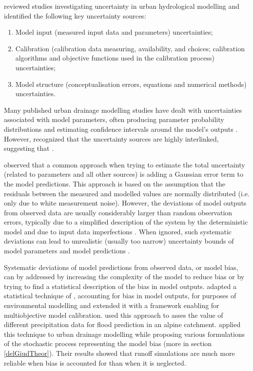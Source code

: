 \documentclass{ctuthesis}\usepackage[]{graphicx}\usepackage[]{color}
\begin{document}
\cite{deleticAssessingUncertaintiesUrban2012} reviewed studies investigating uncertainty in urban hydrological modelling and identified the following key uncertainty sources:
\begin{enumerate}
        \item Model input (measured input data and parameters) uncertainties;
        \item Calibration (calibration data measuring, availability, and choices; calibration algorithms and objective functions used in the calibration process) uncertainties;
        \item Model structure (conceptualisation errors, equations and numerical methods) uncertainties. 
\end{enumerate}

Many published urban drainage modelling studies have dealt with uncertainties associated with model parameters, often producing parameter probability distributions and estimating confidence intervals around the model’s outputs \citep[e.g.][]{thorndahlEventBasedUncertainty2008, dotto2012comparison}. However, \cite{deleticAssessingUncertaintiesUrban2012} recognized that the uncertainty sources are highly interlinked, suggesting that .

\cite{dotto2012comparison} observed that a common approach when trying to estimate the total uncertainty (related to parameters and all other sources) is adding a Gaussian error term to the model predictions. This approach is based on the assumption that the residuals between the measured and modelled values are normally distributed (i.e. only due to white measurement noise). However, the deviations of model outputs from observed data are usually considerably larger than random observation errors, typically due to a simplified description of the system by the deterministic model and due to input data imperfections \citep{reichert2012linking}. When ignored, such systematic deviations can lead to unrealistic (usually too narrow) uncertainty bounds of model parameters and model predictions \citep{reichert2012linking}.

Systematic deviations of model predictions from observed data, or model bias, can by addressed by increasing the complexity of the model to reduce bias or by trying to find a statistical description of the bias in model outputs. \cite{reichert2012linking} adapted a statistical technique of \cite{kennedy2001bayesian}, accounting for bias in model outputs, for purposes of environmental modelling and extended it with a framework enabling for multiobjective model calibration. \citep{sikorskaValueDifferentPrecipitation2018} used this approach to asses the value of different precipitation data for flood prediction in an alpine catchment. \cite{giudice2013improving} applied this technique to urban drainage modelling while proposing various formulations of the stochastic process representing the model bias (more in section \ref{delGiudTheor}). Their results showed that runoff simulations are much more reliable when bias is accounted for than when it is neglected. 
\end{document}

